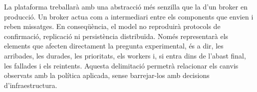 La plataforma treballarà amb una abstracció més senzilla que la d'un broker en
producció. Un broker actua com a intermediari entre els components que envien i
reben missatges. En conseqüència, el model no reproduirà protocols de
confirmació, replicació ni persistència distribuïda. Només representarà els
elements que afecten directament la pregunta experimental, és a dir, les
arribades, les durades, les prioritats, els workers i, si entra dins de l'abast
final, les fallades i els reintents. Aquesta delimitació permetrà relacionar els
canvis observats amb la política aplicada, sense barrejar-los amb decisions
d'infraestructura.
